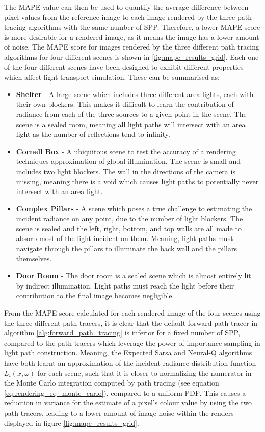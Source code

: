 \documentclass[../dissertation.tex]{subfiles}
\begin{document}
The MAPE value can then be used to quantify the average difference between pixel values from the reference image to each image rendered by the three path tracing algorithms with the same number of SPP. Therefore, a lower MAPE score is more desirable for a rendered image, as it means the image has a lower amount of noise. The MAPE score for images rendered by the three different path tracing algorithms for four different scenes  is shown in \ref{fig:mape_results_grid}. Each one of the four different scenes have been designed to exhibit different properties which affect light transport simulation. These can be summarised as:

\begin{itemize}
\item \textbf{Shelter} - A large scene which includes three different area lights, each with their own blockers. This makes it difficult to learn the contribution of radiance from each of the three sources to a given point in the scene. The scene is a sealed room, meaning all light paths will intersect with an area light as the number of reflections tend to infinity.

\item \textbf{Cornell Box} - A ubiquitous scene to test the accuracy of a rendering techniques approximation of global illumination. The scene is small and includes two light blockers. The wall in the directions of the camera is missing, meaning there is a void which causes light paths to potentially never intersect with an area light.

\item \textbf{Complex Pillars} - A scene which poses a true challenge to estimating the incident radiance on any point, due to the number of light blockers. The scene is sealed and the left, right, bottom, and top walls are all made to absorb most of the light incident on them. Meaning, light paths must navigate through the pillars to illuminate the back wall and the pillars themselves.

\item \textbf{Door Room} - The door room is a sealed scene which is almost entirely lit by indirect illumination. Light paths must reach the light before their contribution to the final image becomes negligible. 
\end{itemize}

From the MAPE score calculated for each rendered image of the four scenes using the three different path tracers, it is clear that the default forward path tracer in algorithm \ref{alg:forward_path_tracing} is inferior for a fixed number of SPP, compared to the path tracers which leverage the power of importance sampling in light path construction. Meaning, the Expected Sarsa and Neural-Q algorithms have both learnt an approximation of the incident radiance distribution function $L_i(x, \omega)$ for each scene, such that it is closer to normalizing the numerator in the Monte Carlo integration computed by path tracing (see equation \ref{eq:rendering_eq_monte_carlo}), compared to a uniform PDF. This causes a reduction in variance for the estimate of a pixel's colour value by using the two path tracers, leading to a lower amount of image noise within the renders displayed in figure \ref{fig:mape_results_grid}.
\end{document}
